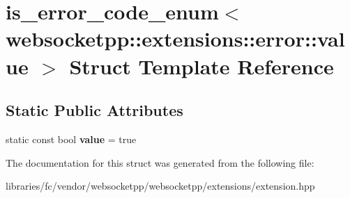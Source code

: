 \hypertarget{structis__error__code__enum_3_01websocketpp_1_1extensions_1_1error_1_1value_01_4}{}\section{is\+\_\+error\+\_\+code\+\_\+enum$<$ websocketpp\+:\+:extensions\+:\+:error\+:\+:value $>$ Struct Template Reference}
\label{structis__error__code__enum_3_01websocketpp_1_1extensions_1_1error_1_1value_01_4}
\subsection*{Static Public Attributes}
\begin{DoxyCompactItemize}
\item 
\mbox{\label{structis__error__code__enum_3_01websocketpp_1_1extensions_1_1error_1_1value_01_4_acf8cec8e2215b469da682dc918d5d996}} 
static const bool {\bfseries value} = true
\end{DoxyCompactItemize}


The documentation for this struct was generated from the following file\+:\begin{DoxyCompactItemize}
\item 
libraries/fc/vendor/websocketpp/websocketpp/extensions/extension.\+hpp\end{DoxyCompactItemize}
